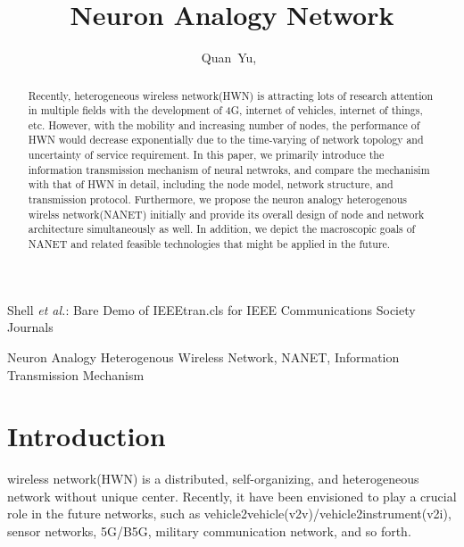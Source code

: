 \documentclass[journal,comsoc]{IEEEtran}
\begin{document}
	
	\title{Neuron Analogy Network}
	
	\author{Quan~Yu,~}	
	{Shell \MakeLowercase{\textit{et al.}}: Bare Demo of IEEEtran.cls for IEEE Communications Society Journals}
	\maketitle
	
	\begin{abstract}
		Recently, heterogeneous wireless network(HWN) is attracting lots of research attention in multiple fields with the development of 4G, internet of vehicles, internet of things, etc. 
		However, with the mobility and increasing number of nodes, the performance of HWN would decrease exponentially due to the time-varying of network topology and uncertainty of service requirement. 
		In this paper, we primarily introduce the information transmission mechanism of neural netwroks, 
		and compare the mechanisim with that of HWN in detail, 
		including the node model, network structure, and transmission protocol. 
		Furthermore, we propose the neuron analogy heterogenous wirelss network(NANET) initially and provide its overall design of node and network architecture simultaneously as well.
		In addition, we depict the macroscopic goals of NANET  and related feasible technologies that might be applied in the future.
	\end{abstract}
	
	\begin{IEEEkeywords}
		Neuron Analogy Heterogenous Wireless Network, NANET, 
		Information Transmission Mechanism
	\end{IEEEkeywords}
	
	\IEEEpeerreviewmaketitle
	
	\section{Introduction}
	\label{section: introduction}
	 wireless network(HWN) is a distributed, self-organizing, and heterogeneous network without unique center.
	Recently, it have been envisioned to play a crucial role in the future networks, 
	such as vehicle2vehicle(v2v)/vehicle2instrument(v2i), sensor networks, 5G/B5G, military communication network, and so forth.
	
\end{document}
